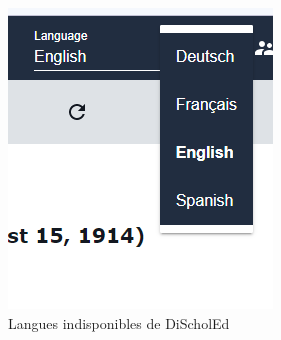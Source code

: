 \begin{figure}[H]
\begin{minipage}{.5\textwidth}
  \includegraphics[width=.7\linewidth]{schémas/langue.png}
  \caption{Langues indisponibles de DiScholEd}
  \label{langue}
\end{minipage}
\end{figure}
